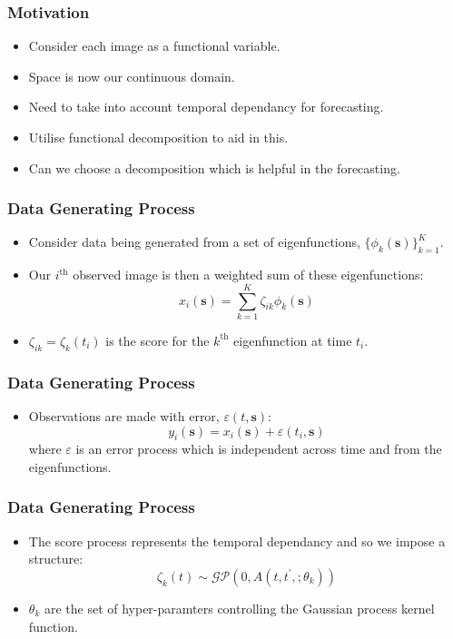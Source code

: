 \documentclass[aspectratio=169]{beamer}
\newcommand{\ve}[1]{\bm{{#1}}}
\begin{document}
  \begin{frame}
    \frametitle{Motivation}
    \begin{itemize}
      \item Consider each image as a functional variable.
      \item Space is now our continuous domain. 
      \item Need to take into account temporal dependancy for forecasting.
      \item Utilise functional decomposition to aid in this. 
      \item Can we choose a decomposition which is helpful in the forecasting. 
    \end{itemize}
  \end{frame}

  \begin{frame}
    \frametitle{Data Generating Process}
    \begin{itemize}
      \item Consider data being generated from a set of eigenfunctions, $\{\phi_k(\ve{s})\}_{k=1}^K$. 
      \item Our $i^\text{th}$ observed image is then a weighted sum of these eigenfunctions: 
        \begin{equation}
          x_i(\ve{s}) = \sum_{k=1}^K \zeta_{ik} \phi_k(\ve{s})
          \label{eqn:ef}
        \end{equation}
      \item $\zeta_{ik} = \zeta_k(t_i)$ is the score for the $k^\text{th}$ eigenfunction at time $t_i$.
    \end{itemize}
  \end{frame}

  \begin{frame}
    \frametitle{Data Generating Process}
    \begin{itemize}
      \item Observations are made with error, $\varepsilon(t, \ve{s})$:
        \begin{equation}
          y_i(\ve{s}) = x_i(\ve{s}) + \varepsilon(t_i, \ve{s})
          \label{eqn:ef_err}
        \end{equation}
        where $\varepsilon$ is an error process which is independent across time and from the eigenfunctions. 
    \end{itemize}
  \end{frame}

  \begin{frame}
    \frametitle{Data Generating Process}
    \begin{itemize}
      \item The score process represents the temporal dependancy and so we impose a structure:
        \begin{equation}
          \zeta_k(t) \sim \mathcal{GP}\left( 0, A(t, t^\prime, ; \theta_k) \right)
          \label{eqnLscores}
        \end{equation}
      \item $\theta_k$ are the set of hyper-paramters controlling the Gaussian process kernel function.
    \end{itemize}
  \end{frame}
\end{document}
